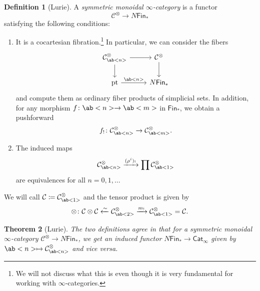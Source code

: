 \documentclass[10pt, oneside]{memoir}
\newtheorem{thm}{Theorem}[subsection]
\theoremstyle{definition}
\newtheorem{defn}[thm]{Definition}
\theoremstyle{remark}
\theoremstyle{plain}
\theoremstyle{definition}
\theoremstyle{remark}
\newcommand{\mc}[1]{\mathcal{#1}}
\newcommand{\mr}[1]{\mathrm{#1}}
\newcommand{\ms}[1]{\mathsf{#1}}
\newcommand{\1}{\mathbf{1}}
\newcommand{\2}{\mathbf{2}}
\newcommand{\3}{\mathbf{3}}
\newcommand{\pt}{\mr{pt}}
\begin{document}
\begin{defn}[Lurie]
    A \textit{symmetric monoidal \(\infty \)-category} is a functor 
    \[ \mc{C}^{\otimes} \to N\ms{Fin}_* \]
    satisfying the following conditions:
    \begin{enumerate}
        \item It is a cocartesian fibration.\footnote{We will not discuss what this is even though it is very fundamental for working with \(\infty \)-categories.} In particular, we can consider the fibers
        \begin{equation*}
        \begin{tikzcd}
            \mc{C}_{\ab<n>}^{\otimes} \ar{r} \ar{d} & \mc{C}^{\otimes} \ar{d} \\
            \pt \ar{r}{\ab<n>} & N\ms{Fin}_*
        \end{tikzcd}
        \end{equation*}
        and compute them as ordinary fiber products of simplicial sets. In addition, for any morphism \(f \colon \ab<n> \to \ab<m> \) in \(\ms{Fin}_* \), we obtain a pushforward
        \[ f_! \colon \mc{C}^{\otimes}_{\ab<n>} \to \mc{C}^{\otimes}_{\ab<m>}. \]
        \item The induced maps
        \[ \mc{C}^{\otimes}_{\ab<n>} \xrightarrow{(\rho^i)_!} \prod \mc{C}_{\ab<1>}^{\otimes} \]
        are equivalences for all \(n = 0, 1, \ldots \)
    \end{enumerate}
\end{defn}

We will call \(\mc{C} \coloneqq \mc{C}_{\ab<1>}^{\otimes} \) and the tensor product is given by
\[ \otimes \colon \mc{C} \otimes \mc{C} \xleftarrow{\sim} \mc{C}_{\ab<2>}^{\otimes} \xrightarrow{m_!} \mc{C}_{\ab<1>}^{\otimes} = \mc{C}. \]

\begin{thm}[Lurie]
    The two definitions agree in that for a symmetric monoidal \(\infty \)-category \(\mc{C}^{\otimes} \to N\ms{Fin}_* \), we get an induced functor \(N\ms{Fin}_* \to \ms{Cat}_{\infty} \) given by \(\ab<n> \mapsto \mc{C}_{\ab<n>}^{\otimes} \) and vice versa.
\end{thm}
\end{document}
